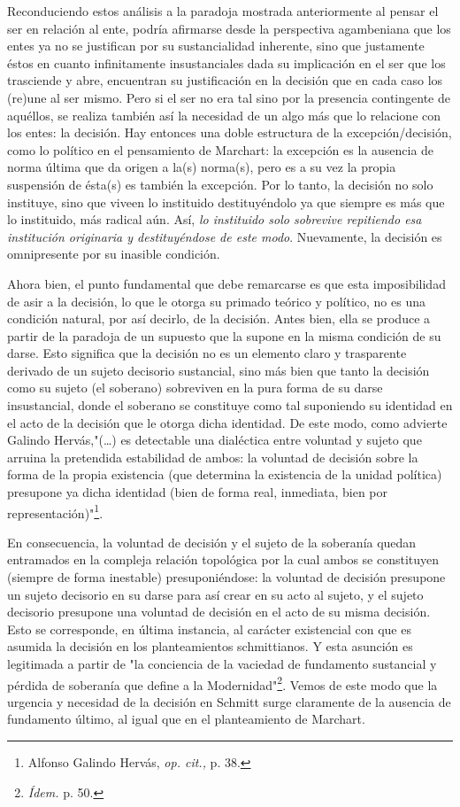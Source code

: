 Reconduciendo estos análisis a la paradoja mostrada anteriormente al
pensar el ser en relación al ente, podría afirmarse desde la perspectiva
agambeniana que los entes ya no se justifican por su sustancialidad
inherente, sino que justamente éstos en cuanto infinitamente
insustanciales dada su implicación en el ser que los trasciende y abre,
encuentran su justificación en la decisión que en cada caso los (re)une
al ser mismo. Pero si el ser no era tal sino por la presencia
contingente de aquéllos, se realiza también así la necesidad de un algo
más que lo relacione con los entes: la decisión. Hay entonces una doble
estructura de la excepción/decisión, como lo político en el pensamiento
de Marchart: la excepción es la ausencia de norma última que da origen a
la(s) norma(s), pero es a su vez la propia suspensión de ésta(s) es
también la excepción. Por lo tanto, la decisión no solo instituye, sino
que viveen lo instituido destituyéndolo ya que siempre es más que lo
instituido, más radical aún. Así, \emph{lo instituido solo sobrevive
repitiendo esa institución originaria y destituyéndose de este modo}.
Nuevamente, la decisión es omnipresente por su inasible condición.

Ahora bien, el punto fundamental que debe remarcarse es que esta
imposibilidad de asir a la decisión, lo que le otorga su primado teórico
y político, no es una condición natural, por así decirlo, de la
decisión. Antes bien, ella se produce a partir de la paradoja de un
supuesto que la supone en la misma condición de su darse. Esto significa
que la decisión no es un elemento claro y trasparente derivado de un
sujeto decisorio sustancial, sino más bien que tanto la decisión como su
sujeto (el soberano) sobreviven en la pura forma de su darse
insustancial, donde el soberano se constituye como tal suponiendo su
identidad en el acto de la decisión que le otorga dicha identidad. De
este modo, como advierte Galindo Hervás,"(\dots) es detectable una
dialéctica entre voluntad y sujeto que arruina la pretendida estabilidad
de ambos: la voluntad de decisión sobre la forma de la propia existencia
(que determina la existencia de la unidad política) presupone ya dicha
identidad (bien de forma real, inmediata, bien por
representación)"\footnote{Alfonso Galindo Hervás, \emph{op. cit.,} p.
  38.}.

En consecuencia, la voluntad de decisión y el sujeto de la soberanía
quedan entramados en la compleja relación topológica por la cual ambos
se constituyen (siempre de forma inestable) presuponiéndose: la voluntad
de decisión presupone un sujeto decisorio en su darse para así crear en
su acto al sujeto, y el sujeto decisorio presupone una voluntad de
decisión en el acto de su misma decisión. Esto se corresponde, en última
instancia, al carácter existencial con que es asumida la decisión en los
planteamientos schmittianos. Y esta asunción es legitimada a partir de
"la conciencia de la vaciedad de fundamento sustancial y pérdida de
soberanía que define a la Modernidad"\footnote{\emph{Ídem.} p. 50.}.
Vemos de este modo que la urgencia y necesidad de la decisión en Schmitt
surge claramente de la ausencia de fundamento último, al igual que en el
planteamiento de Marchart.

